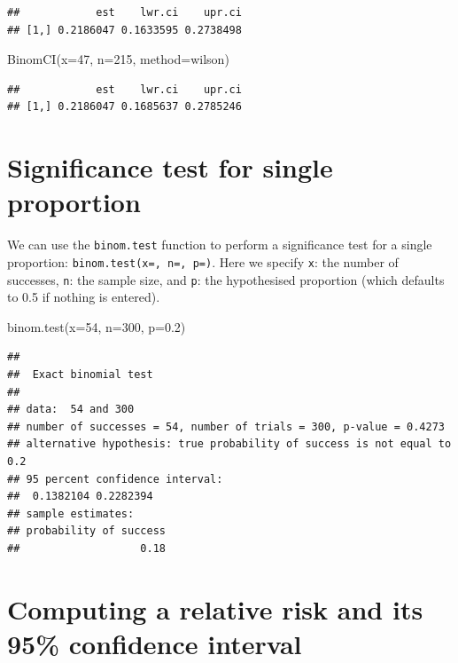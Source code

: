 \documentclass[
]{memoir}
\newenvironment{Shaded}{\begin{snugshade}}{\end{snugshade}}
\newcommand{\AttributeTok}[1]{\textcolor[rgb]{0.77,0.63,0.00}{#1}}
\newcommand{\DecValTok}[1]{\textcolor[rgb]{0.00,0.00,0.81}{#1}}
\newcommand{\FloatTok}[1]{\textcolor[rgb]{0.00,0.00,0.81}{#1}}
\newcommand{\FunctionTok}[1]{\textcolor[rgb]{0.00,0.00,0.00}{#1}}
\newcommand{\NormalTok}[1]{#1}
\newcommand{\StringTok}[1]{\textcolor[rgb]{0.31,0.60,0.02}{#1}}
\begin{document}
\begin{verbatim}
##            est    lwr.ci    upr.ci
## [1,] 0.2186047 0.1633595 0.2738498
\end{verbatim}

\begin{Shaded}
\begin{Highlighting}[]
\FunctionTok{BinomCI}\NormalTok{(}\AttributeTok{x=}\DecValTok{47}\NormalTok{, }\AttributeTok{n=}\DecValTok{215}\NormalTok{, }\AttributeTok{method=}\StringTok{\textquotesingle{}wilson\textquotesingle{}}\NormalTok{)}
\end{Highlighting}
\end{Shaded}

\begin{verbatim}
##            est    lwr.ci    upr.ci
## [1,] 0.2186047 0.1685637 0.2785246
\end{verbatim}

\hypertarget{significance-test-for-single-proportion}{%
\section{Significance test for single proportion}\label{significance-test-for-single-proportion}}

We can use the \texttt{binom.test} function to perform a significance test for a single proportion: \texttt{binom.test(x=,\ n=,\ p=)}. Here we specify \texttt{x}: the number of successes, \texttt{n}: the sample size, and \texttt{p}: the hypothesised proportion (which defaults to 0.5 if nothing is entered).

\begin{Shaded}
\begin{Highlighting}[]
\FunctionTok{binom.test}\NormalTok{(}\AttributeTok{x=}\DecValTok{54}\NormalTok{, }\AttributeTok{n=}\DecValTok{300}\NormalTok{, }\AttributeTok{p=}\FloatTok{0.2}\NormalTok{)}
\end{Highlighting}
\end{Shaded}

\begin{verbatim}
## 
##  Exact binomial test
## 
## data:  54 and 300
## number of successes = 54, number of trials = 300, p-value = 0.4273
## alternative hypothesis: true probability of success is not equal to 0.2
## 95 percent confidence interval:
##  0.1382104 0.2282394
## sample estimates:
## probability of success 
##                   0.18
\end{verbatim}

\hypertarget{computing-a-relative-risk-and-its-95-confidence-interval}{%
\section{Computing a relative risk and its 95\% confidence interval}\label{computing-a-relative-risk-and-its-95-confidence-interval}}
\end{document}

